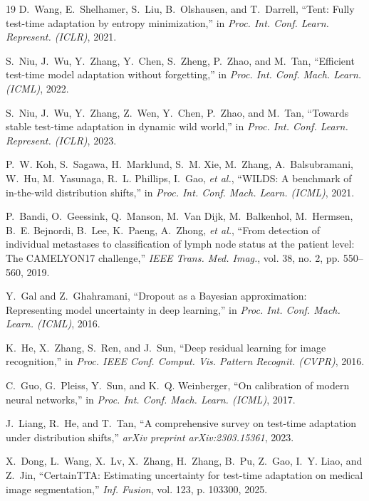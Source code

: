 \documentclass[conference]{IEEEtran}
\begin{document}
\begin{thebibliography}{19}
D.~Wang, E.~Shelhamer, S.~Liu, B.~Olshausen, and T.~Darrell, ``Tent: Fully test-time adaptation by entropy minimization,'' in \textit{Proc. Int. Conf. Learn. Represent. (ICLR)}, 2021.

S.~Niu, J.~Wu, Y.~Zhang, Y.~Chen, S.~Zheng, P.~Zhao, and M.~Tan, ``Efficient test-time model adaptation without forgetting,'' in \textit{Proc. Int. Conf. Mach. Learn. (ICML)}, 2022.

S.~Niu, J.~Wu, Y.~Zhang, Z.~Wen, Y.~Chen, P.~Zhao, and M.~Tan, ``Towards stable test-time adaptation in dynamic wild world,'' in \textit{Proc. Int. Conf. Learn. Represent. (ICLR)}, 2023.

P.~W. Koh, S.~Sagawa, H.~Marklund, S.~M. Xie, M.~Zhang, A.~Balsubramani, W.~Hu, M.~Yasunaga, R.~L. Phillips, I.~Gao, \textit{et al.}, ``{WILDS}: A benchmark of in-the-wild distribution shifts,'' in \textit{Proc. Int. Conf. Mach. Learn. (ICML)}, 2021.

P.~Bandi, O.~Geessink, Q.~Manson, M.~Van Dijk, M.~Balkenhol, M.~Hermsen, B.~E. Bejnordi, B.~Lee, K.~Paeng, A.~Zhong, \textit{et al.}, ``From detection of individual metastases to classification of lymph node status at the patient level: The {CAMELYON17} challenge,'' \textit{IEEE Trans. Med. Imag.}, vol. 38, no. 2, pp. 550--560, 2019.

Y.~Gal and Z.~Ghahramani, ``Dropout as a {Bayesian} approximation: Representing model uncertainty in deep learning,'' in \textit{Proc. Int. Conf. Mach. Learn. (ICML)}, 2016.

K.~He, X.~Zhang, S.~Ren, and J.~Sun, ``Deep residual learning for image recognition,'' in \textit{Proc. IEEE Conf. Comput. Vis. Pattern Recognit. (CVPR)}, 2016.

C.~Guo, G.~Pleiss, Y.~Sun, and K.~Q. Weinberger, ``On calibration of modern neural networks,'' in \textit{Proc. Int. Conf. Mach. Learn. (ICML)}, 2017.

J.~Liang, R.~He, and T.~Tan, ``A comprehensive survey on test-time adaptation under distribution shifts,'' \textit{arXiv preprint arXiv:2303.15361}, 2023.

X.~Dong, L.~Wang, X.~Lv, X.~Zhang, H.~Zhang, B.~Pu, Z.~Gao, I.~Y. Liao, and Z.~Jin, ``{CertainTTA}: Estimating uncertainty for test-time adaptation on medical image segmentation,'' \textit{Inf. Fusion}, vol. 123, p. 103300, 2025.


\end{thebibliography}
\end{document}
